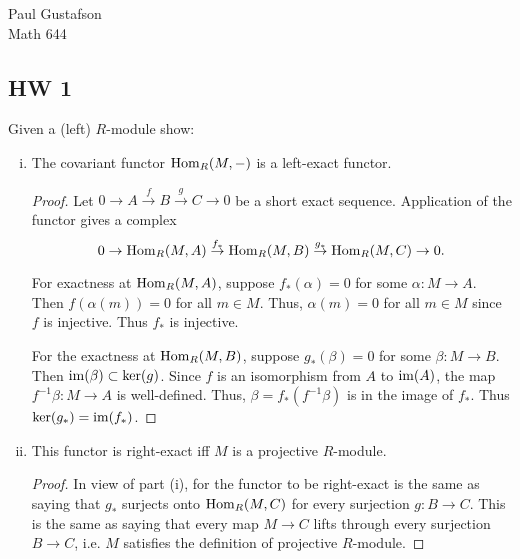 \documentclass{article}
\begin{document}
\noindent Paul Gustafson\\
\noindent Math 644

\subsection*{HW 1}
 Given a (left) $R$-module show:
\begin{enumerate}[i.]
\item The covariant functor $\operatorname{Hom}_R(M,-)$ is a left-exact functor.
\begin{proof}
Let $0 \to A \overset f \to B \overset g \to C \to 0$ be a short exact sequence. Application of the functor gives a complex
$$0 \to \operatorname{Hom}_R(M, A) \overset {f_*} \to \operatorname{Hom}_R(M, B) \overset {g_*} \to 
\operatorname{Hom}_R(M,C) \to 0.$$

For exactness at $\operatorname{Hom}_R(M, A)$, suppose $f_*(\alpha) = 0$ for some $\alpha: M \to A$.  Then $f(\alpha(m)) = 0$ for all $m \in M$.  Thus, $\alpha(m) = 0$ for all $m \in M$ since $f$ is injective.  Thus $f_*$ is injective.

For the exactness at $\operatorname{Hom}_R(M, B)$, suppose $g_*(\beta) = 0$ for some $\beta: M \to B$. Then $\operatorname{im}(\beta) \subset \ker(g)$. Since $f$ is an isomorphism from $A$ to $\operatorname{im}(A)$, the map $f^{-1}\beta : M \to A$ is well-defined. Thus, $\beta = f_*(f^{-1}\beta)$ is in the image of $f_*$. Thus $\ker(g_*) = \operatorname{im}(f_*)$.
\end{proof}

\item This functor is right-exact iff $M$ is a projective $R$-module.
\begin{proof}
In view of part (i), for the functor to be right-exact is the same as saying that $g_*$ surjects onto $\operatorname{Hom}_R(M, C)$ for every surjection $g: B \to C$. This is the same as saying that every map $M \to C$ lifts through every surjection $B \to C$, i.e. $M$ satisfies the definition of projective $R$-module.
\end{proof}

\end{enumerate}
\end{document}
